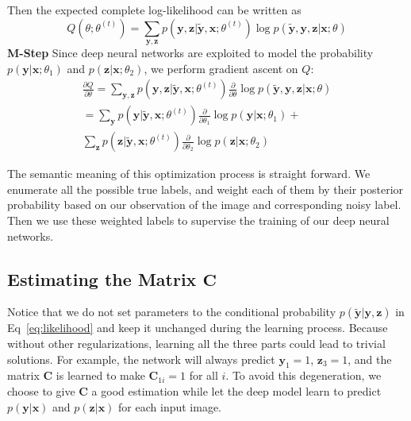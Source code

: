 \documentclass[10pt,twocolumn,letterpaper]{article}
\def\vec{\mathbf}
\def\mat{\mathbf}
\begin{document}
Then the expected complete log-likelihood can be written as
\begin{equation}
    Q(\theta; \theta^{(t)}) = \sum_{\vec{y},\vec{z}} p(\vec{y}, \vec{z} | \tilde{\vec{y}}, \vec{x}; \theta^{(t)}) \log p(\tilde{\vec{y}}, \vec{y}, \vec{z} | \vec{x}; \theta)
\end{equation}
\textbf{M-Step} Since deep neural networks are exploited to model the probability $p(\vec{y}|\vec{x};\theta_1)$ and $p(\vec{z}|\vec{x};\theta_2)$, we perform gradient ascent on $Q$:
\begin{multline} \label{eq:gradient}
    \frac{\partial Q}{\partial \theta} = \sum_{\vec{y},\vec{z}} p(\vec{y}, \vec{z} | \tilde{\vec{y}}, \vec{x}; \theta^{(t)}) \frac{\partial}{\partial \theta} \log p(\tilde{\vec{y}}, \vec{y}, \vec{z} | \vec{x}; \theta) \\
    = \sum_{\vec{y}} p(\vec{y} | \tilde{\vec{y}}, \vec{x}; \theta^{(t)}) \frac{\partial}{\partial \theta_1} \log p(\vec{y}|\vec{x};\theta_1) + \\
      \sum_{\vec{z}} p(\vec{z} | \tilde{\vec{y}}, \vec{x}; \theta^{(t)}) \frac{\partial}{\partial \theta_2} \log p(\vec{z}|\vec{x};\theta_2)
\end{multline}

The semantic meaning of this optimization process is straight forward. We enumerate all the possible true labels, and weight each of them by their posterior probability based on our observation of the image and corresponding noisy label. Then we use these weighted labels to supervise the training of our deep neural networks.

\subsection{Estimating the Matrix $\mat{C}$} %
\label{sub:confusion_estimation}
Notice that we do not set parameters to the conditional probability $p(\tilde{\vec{y}}|\vec{y},\vec{z})$ in Eq~\eqref{eq:likelihood} and keep it unchanged during the learning process. Because without other regularizations, learning all the three parts could lead to trivial solutions. For example, the network will always predict $\vec{y}_1 = 1$, $\vec{z}_3 = 1$, and the matrix $\mat{C}$ is learned to make $\mat{C}_{1i} = 1$ for all $i$. To avoid this degeneration, we choose to give $\mat{C}$ a good estimation while let the deep model learn to predict $p(\vec{y} | \vec{x})$ and $p(\vec{z} | \vec{x})$ for each input image.
\end{document}
